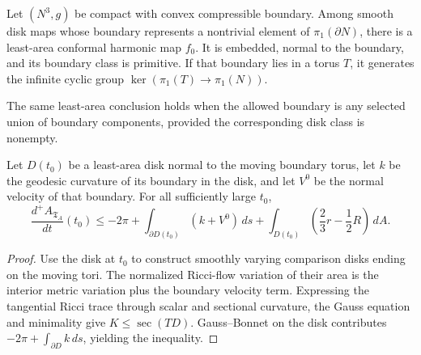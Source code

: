 \begin{theorem}
\label{thm:chow-iv-meeks-yau}

Let \((N^3,g)\) be compact with convex compressible boundary.  Among smooth
disk maps whose boundary represents a nontrivial element of
\(\pi_1(\partial N)\), there is a least-area conformal harmonic map \(f_0\).
It is embedded, normal to the boundary, and its boundary class is primitive.
If that boundary lies in a torus \(T\), it generates the infinite cyclic group
\(\ker(\pi_1(T)\to\pi_1(N))\).
\end{theorem}

\begin{remark}
\label{rem:chow-iv-relative-meeks-yau}

The same least-area conclusion holds when the allowed boundary is any selected
union of boundary components, provided the corresponding disk class is
nonempty.
\end{remark}

\begin{lemma}
\label{lem:chow-iv-minimizing-disk-first-variation}


Let \(D(t_0)\) be a least-area disk normal to the moving boundary torus, let
\(k\) be the geodesic curvature of its boundary in the disk, and let \(V^0\)
be the normal velocity of that boundary.  For all sufficiently large \(t_0\),
\[
 \frac{d^+A_{\mathfrak T_A}}{dt}(t_0)\le -2\pi
 +\int_{\partial D(t_0)}(k+V^0)\,ds
 +\int_{D(t_0)}\left(\frac23r-\frac12R\right)\,dA.
\]
\end{lemma}

\begin{proof}
\sketch
Use the disk at \(t_0\) to construct smoothly varying comparison disks ending
on the moving tori.  The normalized Ricci-flow variation of their area is the
interior metric variation plus the boundary velocity term.  Expressing the
tangential Ricci trace through scalar and sectional curvature, the Gauss
equation and minimality give \(K\le\operatorname{sec}(TD)\).  Gauss--Bonnet on
the disk contributes \(-2\pi+\int_{\partial D}k\,ds\), yielding the inequality.
\end{proof}

